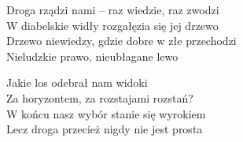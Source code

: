 \begin{text}
Droga rządzi nami – raz wiedzie, raz zwodzi\\
W diabelskie widły rozgałęzia się jej drzewo\\
Drzewo niewiedzy, gdzie dobre w złe przechodzi\\
Nieludzkie prawo, nieubłagane lewo

Jakie los odebrał nam widoki\\
Za horyzontem, za rozstajami rozstań?\\
W końcu nasz wybór stanie się wyrokiem\\
Lecz droga przecież nigdy nie jest prosta
\end{text}